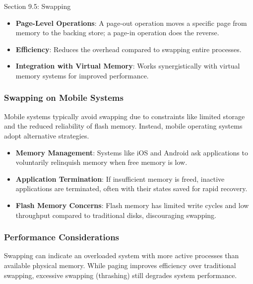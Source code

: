 \begin{notes}{Section 9.5: Swapping}
    \begin{highlight}
        \begin{itemize}
            \item \textbf{Page-Level Operations}: A page-out operation moves a specific page from memory to the backing store; a page-in operation does the reverse.
            \item \textbf{Efficiency}: Reduces the overhead compared to swapping entire processes.
            \item \textbf{Integration with Virtual Memory}: Works synergistically with virtual memory systems for improved performance.
        \end{itemize}
    \end{highlight}
    
    \subsubsection*{Swapping on Mobile Systems}
    
    Mobile systems typically avoid swapping due to constraints like limited storage and the reduced reliability of flash memory. Instead, mobile operating systems adopt alternative strategies.
    
    \begin{highlight}
        \begin{itemize}
            \item \textbf{Memory Management}: Systems like iOS and Android ask applications to voluntarily relinquish memory when free memory is low.
            \item \textbf{Application Termination}: If insufficient memory is freed, inactive applications are terminated, often with their states saved for rapid recovery.
            \item \textbf{Flash Memory Concerns}: Flash memory has limited write cycles and low throughput compared to traditional disks, discouraging swapping.
        \end{itemize}
    \end{highlight}
    
    \subsubsection*{Performance Considerations}
    
    Swapping can indicate an overloaded system with more active processes than available physical memory. While paging improves efficiency over traditional swapping, excessive swapping (thrashing) 
    still degrades system performance.
    

\end{notes}
